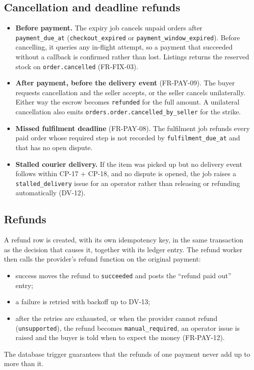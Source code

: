 \documentclass[11pt,a4paper]{article}
\begin{document}
\subsection{Cancellation and deadline refunds}
\label{sec:cancel}
\begin{itemize}[nosep]
  \item \textbf{Before payment.} The expiry job cancels unpaid orders after \texttt{payment\_due\_at} (\texttt{checkout\_expired} or \texttt{payment\_window\_expired}). Before cancelling, it queries any in-flight attempt, so a payment that succeeded without a callback is confirmed rather than lost. Listings returns the reserved stock on \texttt{order.cancelled} (FR-FIX-03).
  \item \textbf{After payment, before the delivery event} (FR-PAY-09). The buyer requests cancellation and the seller accepts, or the seller cancels unilaterally. Either way the escrow becomes \texttt{refunded} for the full amount. A unilateral cancellation also emits \texttt{orders.order.cancelled\_by\_seller} for the strike.
  \item \textbf{Missed fulfilment deadline} (FR-PAY-08). The fulfilment job refunds every paid order whose required step is not recorded by \texttt{fulfilment\_due\_at} and that has no open dispute.
  \item \textbf{Stalled courier delivery.} If the item was picked up but no delivery event follows within CP-17 $+$ CP-18, and no dispute is opened, the job raises a \texttt{stalled\_delivery} issue for an operator rather than releasing or refunding automatically (DV-12).
\end{itemize}

\subsection{Refunds}
\label{sec:refunds}
A refund row is created, with its own idempotency key, in the same transaction as the decision that causes it, together with its ledger entry. The refund worker then calls the provider's refund function on the original payment:
\begin{itemize}[nosep]
  \item success moves the refund to \texttt{succeeded} and posts the ``refund paid out'' entry;
  \item a failure is retried with backoff up to DV-13;
  \item after the retries are exhausted, or when the provider cannot refund (\texttt{unsupported}), the refund becomes \texttt{manual\_required}, an operator issue is raised and the buyer is told when to expect the money (FR-PAY-12).
\end{itemize}
The database trigger guarantees that the refunds of one payment never add up to more than it.
\end{document}
